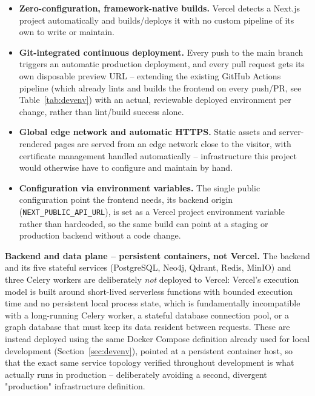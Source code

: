 \documentclass[12pt,a4paper]{report}
\begin{document}
\begin{itemize}
  \item \textbf{Zero-configuration, framework-native builds.} Vercel
        detects a Next.js project automatically and builds/deploys it with
        no custom pipeline of its own to write or maintain.
  \item \textbf{Git-integrated continuous deployment.} Every push to the
        main branch triggers an automatic production deployment, and every
        pull request gets its own disposable preview \ac{URL} -- extending
        the existing GitHub Actions pipeline (which already lints and
        builds the frontend on every push/\ac{PR}, see
        Table~\ref{tab:devenv}) with an actual, reviewable deployed
        environment per change, rather than lint/build success alone.
  \item \textbf{Global edge network and automatic \ac{HTTPS}.} Static
        assets and server-rendered pages are served from an edge network
        close to the visitor, with certificate management handled
        automatically -- infrastructure this project would otherwise have
        to configure and maintain by hand.
  \item \textbf{Configuration via environment variables.} The single
        public configuration point the frontend needs, its backend origin
        (\texttt{NEXT\_PUBLIC\_API\_URL}), is set as a Vercel project
        environment variable rather than hardcoded, so the same build can
        point at a staging or production backend without a code change.
\end{itemize}

\textbf{Backend and data plane -- persistent containers, not Vercel.} The
backend and its five stateful services (PostgreSQL, Neo4j, Qdrant, Redis,
MinIO) and three Celery workers are deliberately \emph{not} deployed to
Vercel: Vercel's execution model is built around short-lived serverless
functions with bounded execution time and no persistent local process
state, which is fundamentally incompatible with a long-running Celery
worker, a stateful database connection pool, or a graph database that must
keep its data resident between requests. These are instead deployed using
the same Docker Compose definition already used for local development
(Section~\ref{sec:devenv}), pointed at a persistent container
host, so that the exact same service topology verified throughout
development is what actually runs in production -- deliberately avoiding a
second, divergent "production" infrastructure definition.
\end{document}
